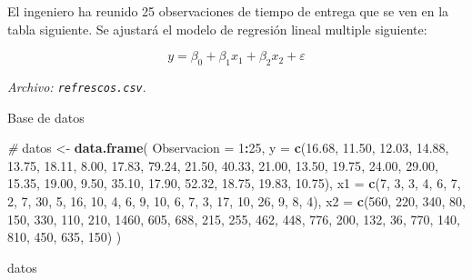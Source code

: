 \documentclass[
]{book}
\newenvironment{Shaded}{\begin{snugshade}}{\end{snugshade}}
\newcommand{\AttributeTok}[1]{\textcolor[rgb]{0.13,0.29,0.53}{#1}}
\newcommand{\CommentTok}[1]{\textcolor[rgb]{0.56,0.35,0.01}{\textit{#1}}}
\newcommand{\DecValTok}[1]{\textcolor[rgb]{0.00,0.00,0.81}{#1}}
\newcommand{\FloatTok}[1]{\textcolor[rgb]{0.00,0.00,0.81}{#1}}
\newcommand{\FunctionTok}[1]{\textcolor[rgb]{0.13,0.29,0.53}{\textbf{#1}}}
\newcommand{\NormalTok}[1]{#1}
\newcommand{\OtherTok}[1]{\textcolor[rgb]{0.56,0.35,0.01}{#1}}
\newcommand{\SpecialCharTok}[1]{\textcolor[rgb]{0.81,0.36,0.00}{\textbf{#1}}}
\begin{document}
El ingeniero ha reunido 25 observaciones de tiempo de entrega que se ven en la tabla siguiente. Se ajustará el modelo de regresión lineal multiple siguiente:

\[
y = \beta_0 + \beta_1 x_1 + \beta_2 x_2 +  \varepsilon
\]

\emph{Archivo: \texttt{refrescos.csv}}.

Base de datos

\begin{Shaded}
\begin{Highlighting}[]
\CommentTok{\# }
\NormalTok{datos }\OtherTok{\textless{}{-}} \FunctionTok{data.frame}\NormalTok{(}
  \AttributeTok{Observacion =} \DecValTok{1}\SpecialCharTok{:}\DecValTok{25}\NormalTok{,}
  \AttributeTok{y =} \FunctionTok{c}\NormalTok{(}\FloatTok{16.68}\NormalTok{, }\FloatTok{11.50}\NormalTok{, }\FloatTok{12.03}\NormalTok{, }\FloatTok{14.88}\NormalTok{, }\FloatTok{13.75}\NormalTok{,}
        \FloatTok{18.11}\NormalTok{, }\FloatTok{8.00}\NormalTok{, }\FloatTok{17.83}\NormalTok{, }\FloatTok{79.24}\NormalTok{, }\FloatTok{21.50}\NormalTok{,}
        \FloatTok{40.33}\NormalTok{, }\FloatTok{21.00}\NormalTok{, }\FloatTok{13.50}\NormalTok{, }\FloatTok{19.75}\NormalTok{, }\FloatTok{24.00}\NormalTok{,}
        \FloatTok{29.00}\NormalTok{, }\FloatTok{15.35}\NormalTok{, }\FloatTok{19.00}\NormalTok{, }\FloatTok{9.50}\NormalTok{, }\FloatTok{35.10}\NormalTok{,}
        \FloatTok{17.90}\NormalTok{, }\FloatTok{52.32}\NormalTok{, }\FloatTok{18.75}\NormalTok{, }\FloatTok{19.83}\NormalTok{, }\FloatTok{10.75}\NormalTok{),}
  \AttributeTok{x1 =} \FunctionTok{c}\NormalTok{(}\DecValTok{7}\NormalTok{, }\DecValTok{3}\NormalTok{, }\DecValTok{3}\NormalTok{, }\DecValTok{4}\NormalTok{, }\DecValTok{6}\NormalTok{,}
         \DecValTok{7}\NormalTok{, }\DecValTok{2}\NormalTok{, }\DecValTok{7}\NormalTok{, }\DecValTok{30}\NormalTok{, }\DecValTok{5}\NormalTok{,}
         \DecValTok{16}\NormalTok{, }\DecValTok{10}\NormalTok{, }\DecValTok{4}\NormalTok{, }\DecValTok{6}\NormalTok{, }\DecValTok{9}\NormalTok{,}
         \DecValTok{10}\NormalTok{, }\DecValTok{6}\NormalTok{, }\DecValTok{7}\NormalTok{, }\DecValTok{3}\NormalTok{, }\DecValTok{17}\NormalTok{,}
         \DecValTok{10}\NormalTok{, }\DecValTok{26}\NormalTok{, }\DecValTok{9}\NormalTok{, }\DecValTok{8}\NormalTok{, }\DecValTok{4}\NormalTok{),}
  \AttributeTok{x2 =} \FunctionTok{c}\NormalTok{(}\DecValTok{560}\NormalTok{, }\DecValTok{220}\NormalTok{, }\DecValTok{340}\NormalTok{, }\DecValTok{80}\NormalTok{, }\DecValTok{150}\NormalTok{,}
         \DecValTok{330}\NormalTok{, }\DecValTok{110}\NormalTok{, }\DecValTok{210}\NormalTok{, }\DecValTok{1460}\NormalTok{, }\DecValTok{605}\NormalTok{,}
         \DecValTok{688}\NormalTok{, }\DecValTok{215}\NormalTok{, }\DecValTok{255}\NormalTok{, }\DecValTok{462}\NormalTok{, }\DecValTok{448}\NormalTok{,}
         \DecValTok{776}\NormalTok{, }\DecValTok{200}\NormalTok{, }\DecValTok{132}\NormalTok{, }\DecValTok{36}\NormalTok{, }\DecValTok{770}\NormalTok{,}
         \DecValTok{140}\NormalTok{, }\DecValTok{810}\NormalTok{, }\DecValTok{450}\NormalTok{, }\DecValTok{635}\NormalTok{, }\DecValTok{150}\NormalTok{)}
\NormalTok{)}

\NormalTok{datos}
\end{Highlighting}
\end{Shaded}
\end{document}

